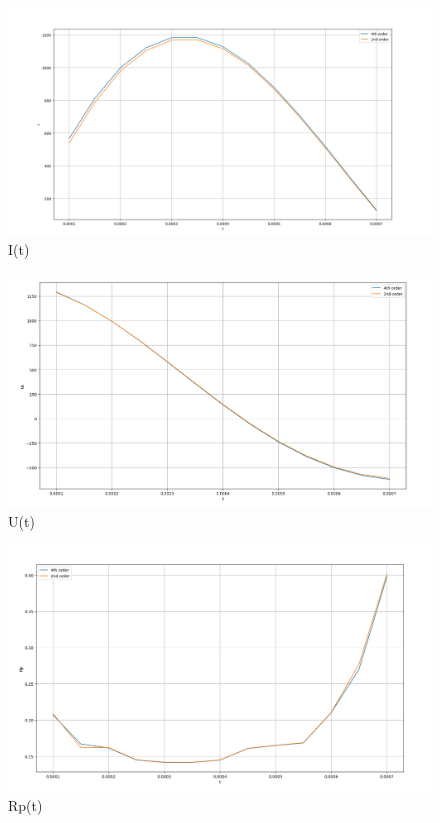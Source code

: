 \documentclass[12pt,a4paper]{scrartcl}
\begin{document}
	\begin{figure}[H]
		\centering
		\includegraphics[width=\linewidth]{../1}
		\caption[I(t)]{I(t)}
		\label{fig:1}
	\end{figure}

	\begin{figure}[H]
		\centering
		\includegraphics[width=\linewidth]{../2}
		\caption[U(t)]{U(t)}
		\label{fig:2}
	\end{figure}

	\begin{figure}[H]
		\centering
		\includegraphics[width=\linewidth]{../3}
		\caption{Rp(t)}
		\label{fig:3}
	\end{figure}
	
\end{document}
